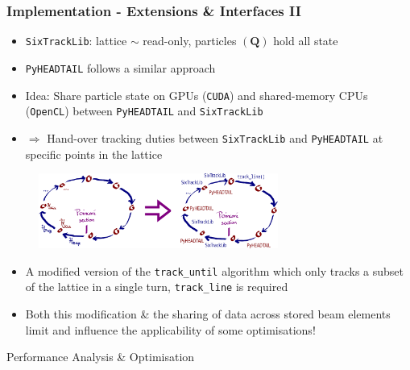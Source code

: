 \documentclass{beamer}
\begin{document}
\begin{frame}
    \frametitle{Implementation - Extensions \& Interfaces II}
    \begin{itemize}
        \item \texttt{SixTrackLib}: lattice $\sim$ read-only, particles $\left( \mathbf{Q} \right)$ hold all state
        \item \texttt{PyHEADTAIL}\cite{pyheadtail-repo-2021} follows a similar approach
        \item {\color{MyDarkBlue}Idea:} Share particle state on GPUs (\texttt{CUDA}) and shared-memory CPUs (\texttt{OpenCL}) between \texttt{PyHEADTAIL} and \texttt{SixTrackLib}
        \item $\Rightarrow$ Hand-over tracking duties between \texttt{SixTrackLib} and \texttt{PyHEADTAIL} at specific points in the lattice\cite{oeftiger-spacecharge-2021}
    \end{itemize}
    \begin{figure}[H]
        \centering
        \includegraphics[width=0.7\textwidth]{poster_images/fig_pyheadtail_sixtracklib_integration}
    \end{figure}
    \begin{itemize}
        \item A modified version of the \texttt{track\_until} algorithm which only tracks a subset of the lattice in a single turn, \texttt{track\_line} is required
        \item Both this modification \& the sharing of data across stored beam elements limit and influence the applicability of some optimisations!
    \end{itemize}
\end{frame}

\begin{frame}
    \begin{center}
    {\HUGE{}Performance Analysis \& Optimisation}
    \end{center}
\end{frame}
\end{document}

